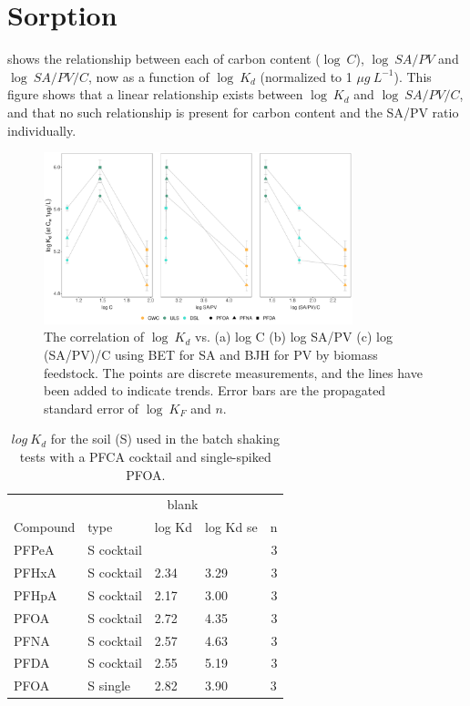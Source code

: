 \chapter{Sorption}\label{appSec:Sorption} 

 shows the relationship between each of carbon content ($\log~C$), $\log~SA/PV$ and $\log~SA/PV/C$, now as a function of $\log~K_d$ (normalized to 1 $\mu g~L^{-1}$). This figure shows that a linear relationship exists between $\log~K_d$ and $\log~SA/PV/C$, and that no such relationship is present for carbon content and the SA/PV ratio individually. 

\begin{figure}[htb]
    \centering
    \includegraphics[width=0.8\textwidth]{R/figs/SAPV_C_Kd1ugL_plot.pdf}
    \caption{The correlation of $\log~K_d$ vs. (a) log C (b) log SA/PV (c) log (SA/PV)/C using BET for SA and BJH for PV by biomass feedstock. The points are discrete measurements, and the lines have been added to indicate trends. Error bars are the propagated standard error of $\log~K_F$ and $n$.}
    \label{appfig:Kd_SAPV_C}
\end{figure}

\begin{table}[ht]
\caption{$log~K_d$ for the soil (S) used in the batch shaking tests with a PFCA cocktail and single-spiked PFOA.}
\centering
\label{apptab:soil_Kd}
\begin{tabular}{llllr} \toprule
         & \multicolumn{4}{c}{blank}                                \\ \cline{2-5} 
Compound & type        & log Kd & log Kd se & \multicolumn{1}{l}{n} \\ \midrule
PFPeA    & S cocktail &        &           & 3                     \\
PFHxA    & S cocktail & 2.34   & 3.29      & 3                     \\
PFHpA    & S cocktail & 2.17   & 3.00      & 3                     \\
PFOA     & S cocktail & 2.72   & 4.35      & 3                     \\
PFNA     & S cocktail & 2.57   & 4.63      & 3                     \\
PFDA     & S cocktail & 2.55   & 5.19      & 3                     \\
PFOA     & S single    & 2.82   & 3.90      & \multicolumn{1}{l}{3} \\ \bottomrule
\end{tabular}
\end{table}


